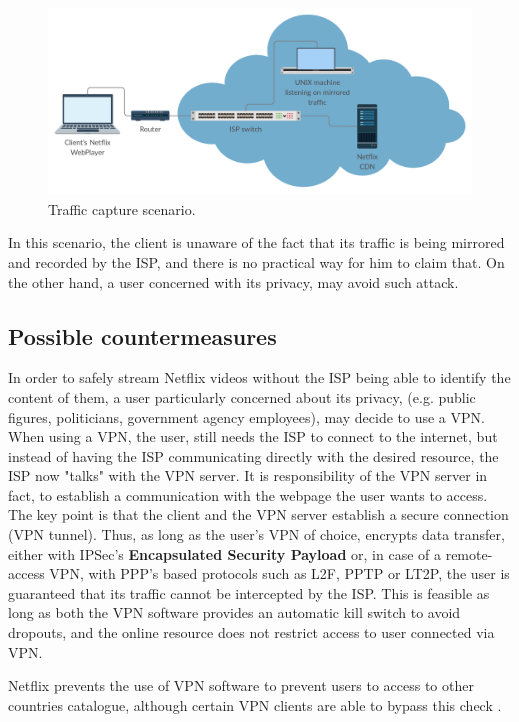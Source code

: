 \begin{figure}[!htb]
  \centering
  \includegraphics[width=\columnwidth]{img/schema.png}
  \caption{Traffic capture scenario.}
  \label{fig:schema}
\end{figure}

In this scenario, the client is unaware of the fact that its traffic is being
mirrored and recorded by the ISP, and there is no practical way for him to
claim that. On the other hand, a user concerned with its privacy, may avoid
such attack.

\subsection{Possible countermeasures}

In order to safely stream Netflix videos without the ISP being able to identify
the content of them, a user particularly concerned about its privacy, (e.g.
public figures, politicians, government agency employees), may decide to use a
VPN. When using a VPN, the user, still needs the ISP to connect to the
internet, but instead of having the ISP communicating directly with the desired
resource, the ISP now "talks" with the VPN server. It is responsibility of the
VPN server in fact, to establish a communication with the webpage the user
wants to access.  The key point is that the client and the VPN server establish
a secure connection (VPN tunnel). Thus, as long as the user's VPN of choice,
encrypts data transfer, either with IPSec's \textbf{Encapsulated Security
Payload} or, in case of a remote-access VPN, with PPP's based protocols such as
L2F, PPTP or LT2P, the user is guaranteed that its traffic cannot be
intercepted by the ISP. This is feasible as long as both the VPN software
provides an automatic kill switch to avoid dropouts, and the online resource
does not restrict access to user connected via VPN. 

Netflix prevents the use of VPN
software to prevent users to access to other countries catalogue, although
certain VPN clients are able to bypass this check \cite{nordvpn}.
